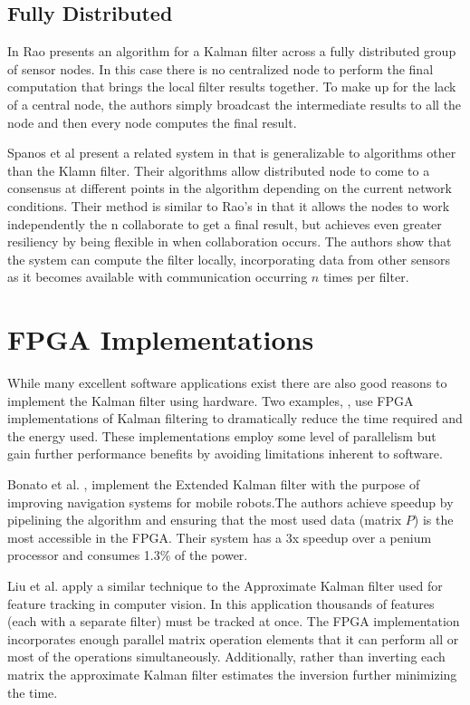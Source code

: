 \documentclass[11pt]{article}
\begin{document}
\subsection{Fully Distributed}
In \cite{rao1991fully} Rao presents an algorithm for a Kalman filter across a fully distributed group of sensor nodes. In this case there is no centralized node to perform the final computation that brings the local filter results together. To make up for the lack of a central node, the authors simply broadcast the intermediate results to all the node and then every node computes the final result.

Spanos et al present a related system in \cite{spanos2005distributed,spanos2005approximate} that is generalizable to algorithms other than the Klamn filter. Their algorithms allow distributed node to come to a consensus at different points in the algorithm depending on the current network conditions. Their method is similar to Rao's in that it allows the nodes to work independently the n collaborate to get a final result, but achieves even greater resiliency by being flexible in when collaboration occurs. The authors show that the system can compute the filter locally, incorporating data from other sensors as it becomes available with communication occurring $n$ times per filter. 

\section{FPGA Implementations}
While many excellent software applications exist there are also good reasons to implement the Kalman filter using hardware. Two examples,  \cite{bonato2009floating,liu2007efficient}, use FPGA implementations of Kalman filtering to dramatically reduce the time required and the energy used. These implementations employ some level of parallelism but gain further performance benefits by avoiding limitations inherent to software.

Bonato et al. \cite{bonato2009floating}, implement the Extended Kalman filter with the purpose of improving navigation systems for mobile robots.The authors achieve speedup by pipelining the algorithm and ensuring that the most used data (matrix $P$) is the most accessible in the FPGA. Their system has a 3x speedup over a penium processor and consumes 1.3\% of the power. 

Liu et al. \cite{liu2007efficient} apply a similar technique to the Approximate Kalman filter used for feature tracking in computer vision. In this application thousands of features (each with a separate filter) must be tracked at once. The FPGA implementation incorporates enough parallel matrix operation elements that it can perform all or most of the operations simultaneously. Additionally, rather than inverting each matrix the approximate Kalman filter estimates the inversion further minimizing the time.
\end{document}

